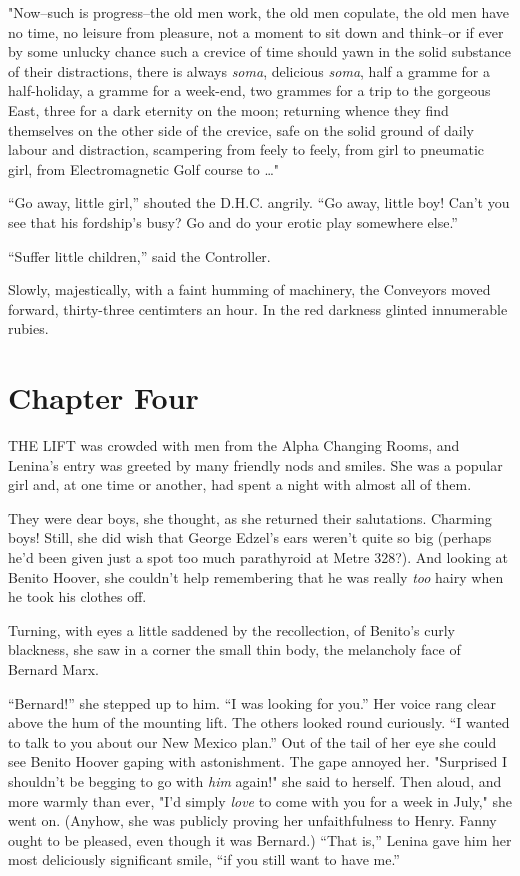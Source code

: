 \documentclass[12pt]{report}
\newcommand{\mychapter}[2]{
\setcounter{chapter}{#1}
    \setcounter{section}{0}
    \chapter*{#2}
    \addcontentsline{toc}{chapter}{#2}
}
\begin{document}
"Now--such is progress--the old men work, the old men copulate, the old
men have no time, no leisure from pleasure, not a moment to sit down and
think--or if ever by some unlucky chance such a crevice of time should
yawn in the solid substance of their distractions, there is always
\emph{soma}, delicious \emph{soma}, half a gramme for a half-holiday, a
gramme for a week-end, two grammes for a trip to the gorgeous East,
three for a dark eternity on the moon; returning whence they find
themselves on the other side of the crevice, safe on the solid ground of
daily labour and distraction, scampering from feely to feely, from girl
to pneumatic girl, from Electromagnetic Golf course to \ldots{}"

``Go away, little girl,'' shouted the D.H.C. angrily. ``Go away, little
boy! Can't you see that his fordship's busy? Go and do your erotic play
somewhere else.''

``Suffer little children,'' said the Controller.

Slowly, majestically, with a faint humming of machinery, the Conveyors
moved forward, thirty-three centimters an hour. In the red darkness
glinted innumerable rubies.

\mychapter{4}{Chapter Four}
THE LIFT was crowded with men from the Alpha Changing Rooms, and
Lenina's entry was greeted by many friendly nods and smiles. She was a
popular girl and, at one time or another, had spent a night with almost
all of them.

They were dear boys, she thought, as she returned their salutations.
Charming boys! Still, she did wish that George Edzel's ears weren't
quite so big (perhaps he'd been given just a spot too much parathyroid
at Metre 328?). And looking at Benito Hoover, she couldn't help
remembering that he was really \emph{too} hairy when he took his clothes
off.

Turning, with eyes a little saddened by the recollection, of Benito's
curly blackness, she saw in a corner the small thin body, the melancholy
face of Bernard Marx.

``Bernard!'' she stepped up to him. ``I was looking for you.'' Her voice
rang clear above the hum of the mounting lift. The others looked round
curiously. ``I wanted to talk to you about our New Mexico plan.'' Out of
the tail of her eye she could see Benito Hoover gaping with
astonishment. The gape annoyed her. "Surprised I shouldn't be begging to
go with \emph{him} again!" she said to herself. Then aloud, and more
warmly than ever, "I'd simply \emph{love} to come with you for a week in
July," she went on. (Anyhow, she was publicly proving her unfaithfulness
to Henry. Fanny ought to be pleased, even though it was Bernard.) ``That
is,'' Lenina gave him her most deliciously significant smile, ``if you
still want to have me.''
\end{document}
